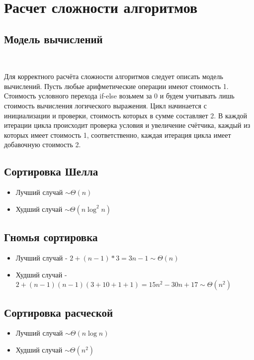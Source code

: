 \documentclass[12pt]{report}
\begin{document}
	
	
	\section{Расчет сложности алгоритмов}
	
	\subsection{Модель вычислений}
	
	~\
	
	Для корректного расчёта сложности алгоритмов следует описать модель
	вычислений. Пусть любые арифметические операции имеют стоимость 1.
	Стоимость условного перехода if-else возьмем за 0 и будем учитывать лишь
	стоимость вычисления логического выражения. Цикл начинается с инициализации и проверки, стоимость которых в сумме составляет 2. В каждой
	итерации цикла происходит проверка условия и увеличение счётчика, каждый из которых имеет стоимость 1, соответственно, каждая итерация цикла
	имеет добавочную стоимость 2.
	
	\subsection{Сортировка Шелла ~\cite{first}}
	\begin{itemize}
		\item Лучший случай $\sim \Theta(n)$
		\item Худший случай $\sim \Theta(n\log^2n)$
	\end{itemize}

	\subsection{Гномья сортировка}
	\begin{itemize}
		\item Лучший случай - $ 2 + (n - 1) * 3 = 3n - 1 \sim \Theta(n)$
		\item Худший случай - $2 + (n - 1)(n - 1)(3 + 10 + 1 + 1) = 15n^2 - 30n + 17 \sim \Theta(n^2)$
	\end{itemize}

	\subsection{Сортировка расческой ~\cite{first}}
	\begin{itemize}
		\item Лучший случай $\sim \Theta(n\log n)$
		\item Худший случай $\sim \Theta(n^2)$
	\end{itemize}
\end{document}
